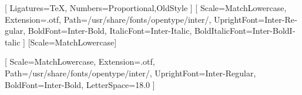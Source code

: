 
\providecommand{\ReportRunningTitle}{Stratégie FX Multi-Moteurs}
\providecommand{\ReportFooterLabel}{Rapport d'investissement --- Juillet 2026}
\providecommand{\ReportPdfTitle}{Stratégie FX Multi-Moteurs --- Rapport d'investissement}
\providecommand{\ReportPdfSubject}{Stratégie quantitative FX diversifiée à quatre moteurs de rendement}
\providecommand{\ReportPdfKeywords}{FX, mean reversion, momentum, portfolio, risk management}

\usepackage{fontspec}
\usepackage{polyglossia}
\setdefaultlanguage{french}

\setmainfont{Latin Modern Roman}[
  Ligatures=TeX,
  Numbers={Proportional,OldStyle}
]
\setsansfont{Inter}[
  Scale=MatchLowercase,
  Extension=.otf,
  Path=/usr/share/fonts/opentype/inter/,
  UprightFont=Inter-Regular,
  BoldFont=Inter-Bold,
  ItalicFont=Inter-Italic,
  BoldItalicFont=Inter-BoldItalic
]
\setmonofont{Latin Modern Mono}[Scale=MatchLowercase]

\newfontfamily{}[
  Scale=MatchLowercase,
  Extension=.otf,
  Path=/usr/share/fonts/opentype/inter/,
  UprightFont=Inter-Regular,
  BoldFont=Inter-Bold,
  LetterSpace=18.0
]

\usepackage[
  a4paper,
  top=2.5cm,
  bottom=2.8cm,
  left=2.6cm,
  right=2.6cm,
  headheight=14pt,
  footskip=1.2cm
]{geometry}

\usepackage{xcolor}

